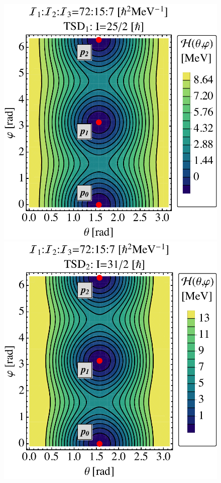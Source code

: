 \documentclass[myclassdoc,debug]{rjparticle}
\begin{document}
\begin{figure}[ht]
\centering
\begin{minipage}{.5\textwidth}
  \centering
  \includegraphics[scale=0.45]{figs/contour1_optimal.pdf}
\end{minipage}%
\begin{minipage}{.5\textwidth}
  \centering
 \includegraphics[scale=0.45]{figs/contour2_optimal.pdf}

\end{minipage}
\end{figure}
\end{document}
